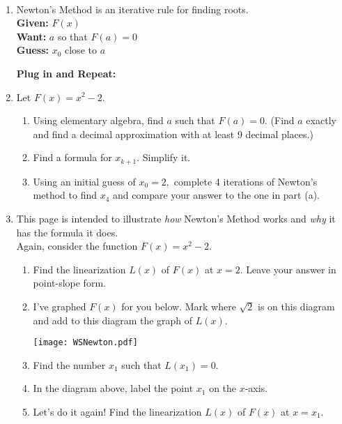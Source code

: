 \documentclass[11pt,fleqn]{article}
\begin{document}
\begin{center}
  \Large{}\\
\end{center}


\begin{enumerate}
\item Newton's Method is an iterative rule for finding roots.\\

\textbf{Given:} $F(x)$\\
\textbf{Want:} $a$ so that $F(a)=0$\\
\textbf{Guess:} $x_0$ close to $a$\\
\vspace{.2in}

\textbf{Plug in and Repeat:}
\vspace{1in}

\item Let $F(x)=x^2-2.$
	\begin{enumerate}
	\item Using elementary algebra, find $a$ such that $F(a) = 0.$ (Find $a$ exactly and find a decimal approximation with at least 9 decimal places.)
	\vspace{1in}
	\item Find a formula for $x_{k+1}.$ Simplify it.
	\vspace{1in}
	\item Using an initial guess of $x_0=2,$ complete 4 iterations of Newton's method to find $x_4$ and compare your answer to the one in part (a).
	\end{enumerate}
\newpage
\item This page is intended to illustrate \emph{how} Newton's Method works and \emph{why} it has the formula it does.\\

Again, consider the function $F(x)=x^2-2.$
	\begin{enumerate}
	\item Find the linearization $L(x)$ of $F(x)$ at $x=2$.  Leave your answer
in point-slope form.
\vfill
	\item I've graphed $F(x)$ for you below.  Mark where $\sqrt{2}$ is on this diagram and add to this diagram
the graph of $L(x)$.

\hfil\texttt{[image: WSNewton.pdf]}
	\item Find the number $x_1$ such that $L(x_1)=0$.
\vfill
	\item In the diagram above, label the point $x_1$ on the $x$-axis.
	\item Let's do it again!  Find the linearization $L(x)$ 
of $F(x)$ at $x=x_1$.
\vfill


\end{enumerate}
\end{enumerate}
\end{document}
